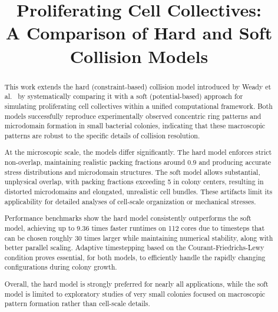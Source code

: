 \documentclass[conference]{IEEEtran}
\begin{document}
\title{Proliferating Cell Collectives: \\A Comparison of Hard and Soft Collision Models}

\author{
}

\maketitle

\begin{abstract}
    This work extends the hard (constraint-based) collision model introduced by Weady et al.~\cite{Weady2024} by systematically comparing it with a soft (potential-based) approach for simulating proliferating cell collectives within a unified computational framework. Both models successfully reproduce experimentally observed concentric ring patterns and microdomain formation in small bacterial colonies, indicating that these macroscopic patterns are robust to the specific details of collision resolution.

    At the microscopic scale, the models differ significantly. The hard model enforces strict non-overlap, maintaining realistic packing fractions around 0.9 and producing accurate stress distributions and microdomain structures. The soft model allows substantial, unphysical overlap, with packing fractions exceeding 5 in colony centers, resulting in distorted microdomains and elongated, unrealistic cell bundles. These artifacts limit its applicability for detailed analyses of cell-scale organization or mechanical stresses.

    Performance benchmarks show the hard model consistently outperforms the soft model, achieving up to 9.36 times faster runtimes on 112 cores due to timesteps that can be chosen roughly 30 times larger while maintaining numerical stability, along with better parallel scaling. Adaptive timestepping based on the Courant-Friedrichs-Lewy condition proves essential, for both models, to efficiently handle the rapidly changing configurations during colony growth.

    Overall, the hard model is strongly preferred for nearly all applications, while the soft model is limited to exploratory studies of very small colonies focused on macroscopic pattern formation rather than cell-scale details.
\end{abstract}
\end{document}
